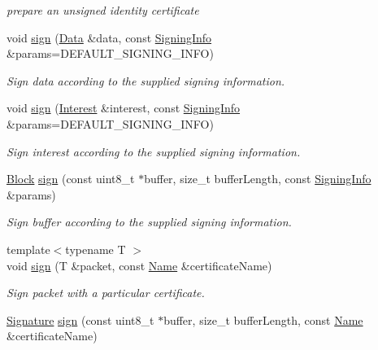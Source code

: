 \begin{DoxyCompactItemize}
\begin{DoxyCompactList}\small\item\em prepare an unsigned identity certificate \end{DoxyCompactList}\item 
void \hyperlink{classndn_1_1security_1_1KeyChain_a787253e1e20d5c836e0eb8726285c484}{sign} (\hyperlink{classndn_1_1Data}{Data} \&data, const \hyperlink{classndn_1_1security_1_1SigningInfo}{Signing\+Info} \&params=D\+E\+F\+A\+U\+L\+T\+\_\+\+S\+I\+G\+N\+I\+N\+G\+\_\+\+I\+N\+FO)
\begin{DoxyCompactList}\small\item\em Sign data according to the supplied signing information. \end{DoxyCompactList}\item 
void \hyperlink{classndn_1_1security_1_1KeyChain_a1dd089cd000f2e2766bfec000e96eced}{sign} (\hyperlink{classndn_1_1Interest}{Interest} \&interest, const \hyperlink{classndn_1_1security_1_1SigningInfo}{Signing\+Info} \&params=D\+E\+F\+A\+U\+L\+T\+\_\+\+S\+I\+G\+N\+I\+N\+G\+\_\+\+I\+N\+FO)
\begin{DoxyCompactList}\small\item\em Sign interest according to the supplied signing information. \end{DoxyCompactList}\item 
\hyperlink{classndn_1_1Block}{Block} \hyperlink{classndn_1_1security_1_1KeyChain_a92e3ef8eb76208713612370d72187a58}{sign} (const uint8\+\_\+t $\ast$buffer, size\+\_\+t buffer\+Length, const \hyperlink{classndn_1_1security_1_1SigningInfo}{Signing\+Info} \&params)
\begin{DoxyCompactList}\small\item\em Sign buffer according to the supplied signing information. \end{DoxyCompactList}\item 
{\footnotesize template$<$typename T $>$ }\\void \hyperlink{classndn_1_1security_1_1KeyChain_a38cd4d4750a9b844953994e0e6731856}{sign} (T \&packet, const \hyperlink{classndn_1_1Name}{Name} \&certificate\+Name)
\begin{DoxyCompactList}\small\item\em Sign packet with a particular certificate. \end{DoxyCompactList}\item 
\hyperlink{classndn_1_1Signature}{Signature} \hyperlink{classndn_1_1security_1_1KeyChain_a70cadd2bfce67770acfba02f1a6cf66d}{sign} (const uint8\+\_\+t $\ast$buffer, size\+\_\+t buffer\+Length, const \hyperlink{classndn_1_1Name}{Name} \&certificate\+Name)

\end{DoxyCompactItemize}
